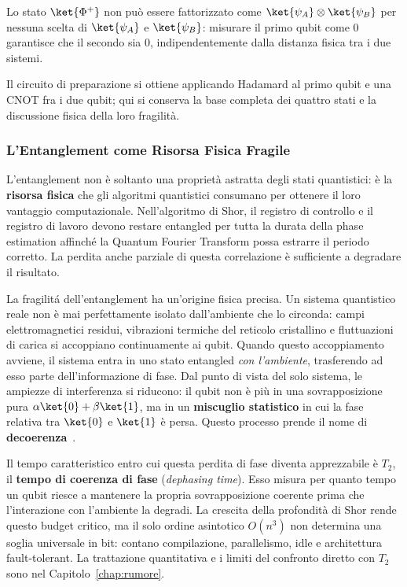 \begin{onehalfspace}
Lo stato $\ket{\Phi^+}$ non può essere fattorizzato come $\ket{\psi_A} \otimes \ket{\psi_B}$ per nessuna scelta di $\ket{\psi_A}$ e $\ket{\psi_B}$: misurare il primo qubit come $0$ garantisce che il secondo sia $0$, indipendentemente dalla distanza fisica tra i due sistemi.

Il circuito di preparazione si ottiene applicando Hadamard al primo qubit e
una CNOT fra i due qubit; qui si conserva la base completa dei quattro stati e
la discussione fisica della loro fragilità.

\subsubsection{L'Entanglement come Risorsa Fisica Fragile}
\label{sec:entanglement_fragile}

L'entanglement non è soltanto una proprietà astratta degli stati quantistici: è la \textbf{risorsa fisica} che gli algoritmi quantistici consumano per ottenere il loro vantaggio computazionale. Nell'algoritmo di Shor, il registro di controllo e il registro di lavoro devono restare entangled per tutta la durata della phase estimation affinché la Quantum Fourier Transform possa estrarre il periodo corretto. La perdita anche parziale di questa correlazione è sufficiente a degradare il risultato.

La fragilitá dell'entanglement ha un'origine fisica precisa. Un sistema quantistico reale non è mai perfettamente isolato dall'ambiente che lo circonda: campi elettromagnetici residui, vibrazioni termiche del reticolo cristallino e fluttuazioni di carica si accoppiano continuamente ai qubit. Quando questo accoppiamento avviene, il sistema entra in uno stato entangled \textit{con l'ambiente}, trasferendo ad esso parte dell'informazione di fase. Dal punto di vista del solo sistema, le ampiezze di interferenza si riducono: il qubit non è più in una sovrapposizione pura $\alpha\ket{0}+\beta\ket{1}$, ma in un \textbf{miscuglio statistico} in cui la fase relativa tra $\ket{0}$ e $\ket{1}$ è persa. Questo processo prende il nome di \textbf{decoerenza}~\cite{zurek2003}.

Il tempo caratteristico entro cui questa perdita di fase diventa apprezzabile è $T_2$, il \textbf{tempo di coerenza di fase} (\textit{dephasing time}). Esso misura per quanto tempo un qubit riesce a mantenere la propria sovrapposizione coerente prima che l'interazione con l'ambiente la degradi. La crescita della profondità di Shor rende questo budget critico, ma il solo ordine asintotico $O(n^3)$ non determina una soglia universale in bit: contano compilazione, parallelismo, idle e architettura fault-tolerant. La trattazione quantitativa e i limiti del confronto diretto con $T_2$ sono nel Capitolo~\ref{chap:rumore}.


\end{onehalfspace}
